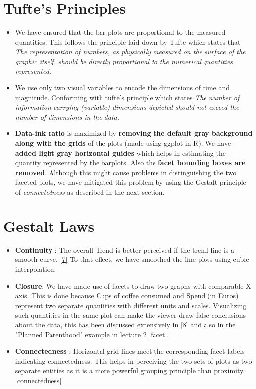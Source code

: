 \documentclass[a4paper,11pt]{article}
\begin{document}
\begin{multicols}{2}
\section*{Tufte’s Principles}	
\begin{itemize}
	\item We have ensured that the bar plots are proportional to the measured quantities. This follows the principle laid down by Tufte which states that \textit{The representation of numbers, as physically measured on the surface of the graphic itself, should be directly proportional to the numerical quantities represented.}
	\item We use only two visual variables to encode the dimensions of time and magnitude. Conforming with tufte’s principle which states \textit{The number of information-carrying (variable) dimensions depicted should not exceed the number of dimensions in the data.} 
	\item \textbf{Data-ink ratio} is maximized by \textbf{removing the default gray background along with the grids} of the plots (made using ggplot in R). We have \textbf{added light gray horizontal guides} which helps in estimating the quantity represented by the barplots. Also the \textbf{facet bounding boxes are removed}. Although this might cause problems in distinguishing the two faceted plots, we have mitigated this problem by using the Gestalt principle of \textit{connectedness} as described in the next section.
\end{itemize}
\section*{Gestalt Laws} 
\begin{itemize}
	\item \textbf{Continuity} : The overall Trend is better perceived if the trend line is a smooth curve. \ref{7} To that effect, we have smoothed the line plots using cubic interpolation.
	\item \textbf{Closure}: We have made use of facets to draw two graphs with comparable X axis. This is done because Cups of coffee consumed and Spend (in Euros) represent two separate quantities with different units and scales. Visualizing such quantities in the same plot can make the viewer draw false conclusions about the data, this has been discussed extensively in \ref{8} and also in the "Planned Parenthood" example in lecture 2 \ref{facet}.
	\item \textbf{Connectedness} : Horizontal grid lines meet the corresponding facet labels indicating connectedness. This helps in perceiving the two sets of plots as two separate entities as it is a more powerful grouping principle than proximity.\ref{connectedness}
\end{itemize}

\end{multicols}
\end{document}
